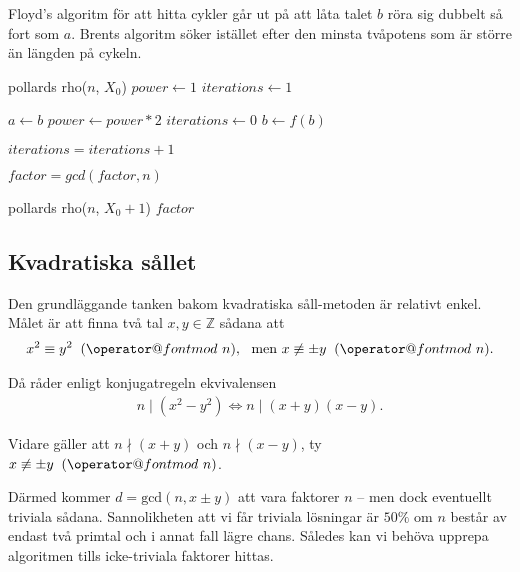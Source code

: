 \documentclass[a4paper,12pt]{article}
\makeatletter
\def\imod#1{\allowbreak\mkern10mu({\operator@font mod}\,\,#1)}
\renewcommand{\*}{\ensuremath{\cdot}}
\makeatother
\begin{document}
Floyd's algoritm för att hitta cykler går ut på att låta talet $b$ röra sig dubbelt så fort som $a$. Brents algoritm söker istället efter den minsta tvåpotens som är större än längden på cykeln.
\begin{algorithmic}
    \STATE pollards rho($n$, $X_0$)
        \STATE $power \gets 1$
        \STATE $iterations \gets 1$

                    \STATE $a \gets b$
                    \STATE $power \gets power *2$
                    \STATE $iterations \gets 0$
                \ENDIF 
                \STATE $b \gets f(b)$

                \STATE $iterations = iterations + 1$
            
            \ENDFOR


            \STATE $factor = gcd(factor, n)$
        \ENDWHILE

            \STATE {}
            \RETURN pollards rho($n$, $X_0+1$) 
            \RETURN $factor$
        \ENDIF
\end{algorithmic}


\subsection{Kvadratiska sållet}

Den grundläggande tanken bakom kvadratiska såll-metoden är relativt enkel. Målet
är att finna två tal $x, y \in \mathbb{Z}$ sådana att
\begin{align*}
    x^2 \equiv y^2 \imod{n}, \ \text{ men } x \not\equiv \pm y \imod{n}.
\end{align*}

Då råder enligt konjugatregeln ekvivalensen
\begin{align*}
    n \mid (x^2 - y^2) \Leftrightarrow n \mid (x+y)(x-y).
\end{align*}

Vidare gäller att $n \nmid (x+y)$ och $n \nmid (x-y)$, ty $x \not\equiv \pm y
\imod{n}$. 

Därmed kommer $d = \text{gcd}\left( n, x \pm y \right)$ att vara faktorer  $n$
-- men dock eventuellt triviala sådana. Sannolikheten att vi får triviala
lösningar är $50 \%$ om $n$ består av endast två primtal och i annat fall lägre
chans. Således kan vi behöva upprepa algoritmen tills icke-triviala faktorer
hittas.
\end{document}
